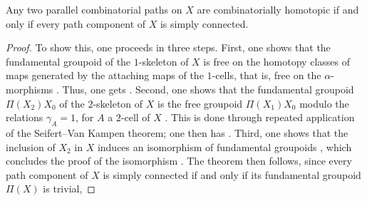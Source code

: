 
\begin{thm}
\label{thm:top-coherence}
    Any two parallel combinatorial paths on $X$ are combinatorially homotopic if and only if every path component of $X$ is simply connected.
\end{thm}

\begin{proof}
    To show this, one proceeds in three steps. 
    First, one shows that the fundamental groupoid  of the $1$-skeleton of $X$ is free on the homotopy classes of maps generated by the attaching maps of the $1$-cells, that is, free on the $\alpha$-morphisms \cite[9.1.5]{Brown2006}.
    Thus, one gets . 
    Second, one shows that the fundamental groupoid $\Pi(X_2)X_0$ of the $2$-skeleton of $X$ is the free groupoid $\Pi(X_1)X_0$ modulo the relations $\gamma_A=1$, for $A$ a $2$-cell of $X$ \cite[9.1.6]{Brown2006}. 
    This is done through repeated application of the Seifert--Van Kampen theorem; one then has .
    Third, one shows that the inclusion of $X_2$ in $X$ induces an isomorphism of fundamental groupoids  \cite[9.1.7]{Brown2006}, which concludes the proof of the isomorphism .
    The theorem then follows, since every path component of $X$ is simply connected if and only if its fundamental groupoid $\Pi(X)$ is trivial,   
\end{proof}


